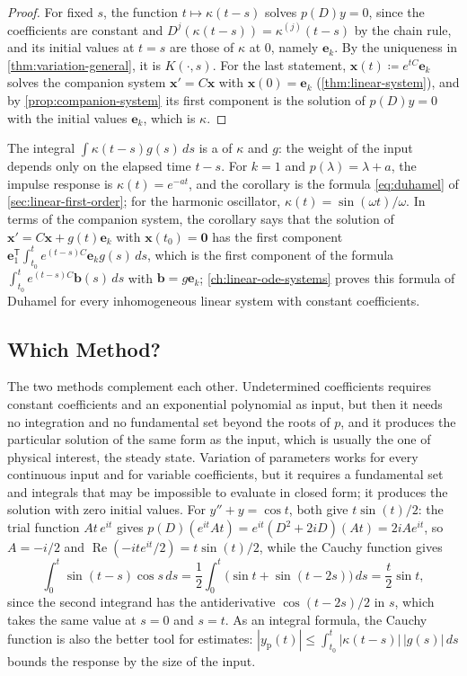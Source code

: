 \begin{proof}
For fixed $s$, the function $t\mapsto\kappa(t-s)$ solves $p(D)y=0$, since the coefficients are constant and $D^j(\kappa(t-s))=\kappa^{(j)}(t-s)$ by the chain rule, and its initial values at $t=s$ are those of $\kappa$ at $0$, namely $\mathbf e_k$. By the uniqueness in \cref{thm:variation-general}, it is $K(\cdot,s)$. For the last statement, $\mathbf x(t)\coloneqq e^{tC}\mathbf e_k$ solves the companion system $\mathbf x'=C\mathbf x$ with $\mathbf x(0)=\mathbf e_k$ (\cref{thm:linear-system}), and by \cref{prop:companion-system} its first component is the solution of $p(D)y=0$ with the initial values $\mathbf e_k$, which is $\kappa$.
\end{proof}

The integral $\int\kappa(t-s)g(s)\,ds$ is a  of $\kappa$ and $g$: the weight of the input depends only on the elapsed time $t-s$. For $k=1$ and $p(\lambda)=\lambda+a$, the impulse response is $\kappa(t)=e^{-at}$, and the corollary is the formula \eqref{eq:duhamel} of \cref{sec:linear-first-order}; for the harmonic oscillator, $\kappa(t)=\sin(\omega t)/\omega$. In terms of the companion system, the corollary says that the solution of $\mathbf x'=C\mathbf x+g(t)\mathbf e_k$ with $\mathbf x(t_0)=\mathbf 0$ has the first component $\mathbf e_1^{\mathsf T}\int_{t_0}^te^{(t-s)C}\mathbf e_kg(s)\,ds$, which is the first component of the formula $\int_{t_0}^te^{(t-s)C}\mathbf b(s)\,ds$ with $\mathbf b=g\mathbf e_k$; \cref{ch:linear-ode-systems} proves this formula of Duhamel for every inhomogeneous linear system with constant coefficients.

\subsection{Which Method?}

The two methods complement each other. Undetermined coefficients requires constant coefficients and an exponential polynomial as input, but then it needs no integration and no fundamental set beyond the roots of $p$, and it produces the particular solution of the same form as the input, which is usually the one of physical interest, the steady state. Variation of parameters works for every continuous input and for variable coefficients, but it requires a fundamental set and integrals that may be impossible to evaluate in closed form; it produces the solution with zero initial values. For $y''+y=\cos t$, both give $t\sin(t)/2$: the trial function $At\,e^{it}$ gives $p(D)(e^{it}At)=e^{it}(D^2+2iD)(At)=2iAe^{it}$, so $A=-i/2$ and $\operatorname{Re}(-ite^{it}/2)=t\sin(t)/2$, while the Cauchy function gives
\[
\int_0^t\sin(t-s)\cos s\,ds=\frac12\int_0^t\bigl(\sin t+\sin(t-2s)\bigr)\,ds=\frac t2\sin t ,
\]
since the second integrand has the antiderivative $\cos(t-2s)/2$ in $s$, which takes the same value at $s=0$ and $s=t$. As an integral formula, the Cauchy function is also the better tool for estimates: $|y_{\mathrm p}(t)|\le\int_{t_0}^t|\kappa(t-s)|\,|g(s)|\,ds$ bounds the response by the size of the input.

